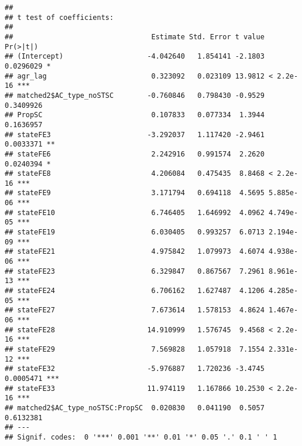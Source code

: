 \documentclass[
]{article}
\newenvironment{Shaded}{\begin{snugshade}}{\end{snugshade}}
\newcommand{\AttributeTok}[1]{\textcolor[rgb]{0.77,0.63,0.00}{#1}}
\newcommand{\FunctionTok}[1]{\textcolor[rgb]{0.00,0.00,0.00}{#1}}
\newcommand{\NormalTok}[1]{#1}
\newcommand{\OtherTok}[1]{\textcolor[rgb]{0.56,0.35,0.01}{#1}}
\newcommand{\SpecialCharTok}[1]{\textcolor[rgb]{0.00,0.00,0.00}{#1}}
\newcommand{\StringTok}[1]{\textcolor[rgb]{0.31,0.60,0.02}{#1}}
\begin{document}
\begin{Shaded}
\end{Shaded}

\begin{verbatim}
## 
## t test of coefficients:
## 
##                                 Estimate Std. Error t value  Pr(>|t|)    
## (Intercept)                    -4.042640   1.854141 -2.1803 0.0296029 *  
## agr_lag                         0.323092   0.023109 13.9812 < 2.2e-16 ***
## matched2$AC_type_noSTSC        -0.760846   0.798430 -0.9529 0.3409926    
## PropSC                          0.107833   0.077334  1.3944 0.1636957    
## stateFE3                       -3.292037   1.117420 -2.9461 0.0033371 ** 
## stateFE6                        2.242916   0.991574  2.2620 0.0240394 *  
## stateFE8                        4.206084   0.475435  8.8468 < 2.2e-16 ***
## stateFE9                        3.171794   0.694118  4.5695 5.885e-06 ***
## stateFE10                       6.746405   1.646992  4.0962 4.749e-05 ***
## stateFE19                       6.030405   0.993257  6.0713 2.194e-09 ***
## stateFE21                       4.975842   1.079973  4.6074 4.938e-06 ***
## stateFE23                       6.329847   0.867567  7.2961 8.961e-13 ***
## stateFE24                       6.706162   1.627487  4.1206 4.285e-05 ***
## stateFE27                       7.673614   1.578153  4.8624 1.467e-06 ***
## stateFE28                      14.910999   1.576745  9.4568 < 2.2e-16 ***
## stateFE29                       7.569828   1.057918  7.1554 2.331e-12 ***
## stateFE32                      -5.976887   1.720236 -3.4745 0.0005471 ***
## stateFE33                      11.974119   1.167866 10.2530 < 2.2e-16 ***
## matched2$AC_type_noSTSC:PropSC  0.020830   0.041190  0.5057 0.6132381    
## ---
## Signif. codes:  0 '***' 0.001 '**' 0.01 '*' 0.05 '.' 0.1 ' ' 1
\end{verbatim}
\end{document}
